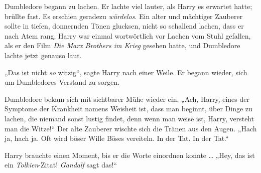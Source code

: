 Dumbledore begann zu lachen. Er lachte viel lauter, als Harry es erwartet hatte; brüllte fast. Es erschien geradezu \emph{würdelos}. Ein alter und mächtiger Zauberer sollte in tiefen, donnernden Tönen glucksen, nicht so schallend lachen, dass er nach Atem rang. Harry war einmal wortwörtlich vor Lachen vom Stuhl gefallen, als er den Film \emph{Die Marx Brothers im Krieg} gesehen hatte, und Dumbledore lachte jetzt genauso laut.%

„Das ist nicht \emph{so} witzig“, sagte Harry nach einer Weile. Er begann wieder, sich um Dumbledores Verstand zu sorgen.

Dumbledore bekam sich mit sichtbarer Mühe wieder ein.
„Ach, Harry, eines der Symptome der Krankheit namens Weisheit ist, dass man beginnt, über Dinge zu lachen, die niemand sonst lustig findet, denn wenn man weise ist, Harry, versteht man die Witze!“ Der alte Zauberer wischte sich die Tränen aus den Augen.
„Hach ja, hach ja. Oft wird böser Wille Böses vereiteln. In der Tat. In der Tat.“%

Harry brauchte einen Moment, bis er die Worte einordnen konnte …
„Hey, das ist ein \emph{Tolkien}-Zitat! \emph{Gandalf} sagt das!“

